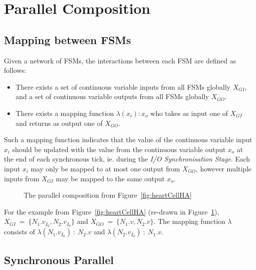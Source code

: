 \section{Parallel Composition}
\label{sec:composition}


\subsection{Mapping between \acp{FSM}}
\label{sec:mapping}

Given a network of \acp{FSM}, the interactions between each \ac{FSM} are 
defined as follows:
\begin{itemize}
	\item There exists a set of continuous variable inputs from all \acp{FSM} 
	globally $X_{GI}$, and a set of continuous variable outputs from all 
	\acp{FSM} globally $X_{GO}$.
	\item There exists a mapping function $\lambda(x_i) : x_o$ who takes as 
	input one of $X_{GI}$ and returns as output one of $X_{GO}$.
\end{itemize}

Such a mapping function indicates that the value of the continuous variable 
input $x_i$ should be updated with the value from the continuous variable 
output $x_o$ at the end of each synchronous tick, ie. during the \emph{I/O 
Synchronisation Stage}.  Each input $x_i$ may only be mapped to at most one 
output from $X_{GO}$, however multiple inputs from $X_{GI}$ may be mapped to 
the same output $x_o$.

\begin{figure}
	\centering
	
	\caption{The parallel composition from Figure~\ref{fig:heartCellHA} 
		\label{fig:networkComposition}}
\end{figure}

For the example from Figure~\ref{fig:heartCellHA} (re-drawn in 
Figure~\ref{fig:networkComposition}), 
$X_{GI}~=~\{N_{1}.v_{I_{0}},N_{2}.v_{I_{0}}\}$ and 
$X_{GO}~=~\{N_{1}.v,N_{2}.v\}$. 
The mapping function $\lambda$ consists of 
$\lambda(N_{1}.v_{I_{0}})~:~N_{2}.v$ and $\lambda(N_{2}.v_{I_{0}})~:~N_{1}.v$.

\subsection{Synchronous Parallel}
\label{sec:synchronousParallel}

%  

